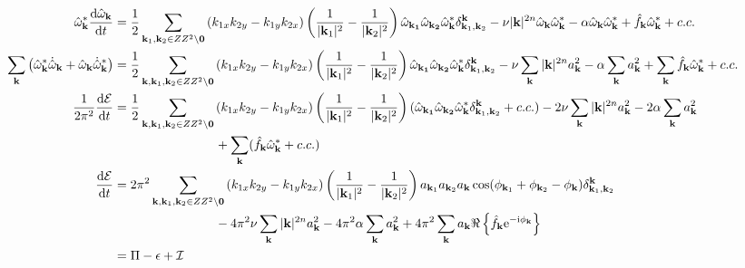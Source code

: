 \documentclass[9pt]{article}
\newcommand{\der}[2]{\frac{\mathrm{d}#1}{\mathrm{d}#2}}          	 %
\newcommand{\ii}{\mathrm{i}}      								  %
\newcommand{\e}{\mathrm{e}}      								  %
\newcommand{\omegahat}[1]{\hat{\omega}_{ \mathbf{#1} } }								%
\newcommand{\bfk}{\mathbf{k}}								%
\newcommand{\bfkn}[1]{\mathbf{k}_{#1}}								%
\begin{document}
\begin{align}
	\omegahat{k}^*\der{\omegahat{k}}{t} &= \frac{1}{2}	\sum_{\mathbf{k}_1, \mathbf{k}_2\in \mathbb{Z}^2\setminus \mathbf{0}}\left(k_{1x}k_{2y} - k_{1y}k_{2x}\right) \left(\frac{1}{|\bfkn{1}|^2} - \frac{1}{|\bfkn{2}|^2}\right) \omegahat{\bfkn{1}}\omegahat{\bfkn{2}}\omegahat{k}^* \delta_{\bfkn{1}, \bfkn{2}}^{\bfk} - \nu |\bfk|^{2n}\omegahat{k}\omegahat{k}^* - \alpha\omegahat{k}\omegahat{k}^* + \hat{f}_{\bfk} \omegahat{k}^* + c. c. \notag \\
	\sum_{\bfk}\left(\omegahat{k}^*\dot{\hat{\omega}}_\bfk + \omegahat{k}\dot{\hat{\omega}}^*_\bfk\right)&= \frac{1}{2}	\sum_{\bfk, \mathbf{k}_1, \mathbf{k}_2\in \mathbb{Z}^2\setminus \mathbf{0}}\left(k_{1x}k_{2y} - k_{1y}k_{2x}\right) \left(\frac{1}{|\bfkn{1}|^2} - \frac{1}{|\bfkn{2}|^2}\right) \omegahat{\bfkn{1}}\omegahat{\bfkn{2}}\omegahat{k}^* \delta_{\bfkn{1}, \bfkn{2}}^{\bfk} - \nu \sum_{\bfk}|\bfk|^{2n} a_{\bfk}^2 - \alpha\sum_{\bfk} a_{\bfk}^2 + \sum_{\bfk}\hat{f}_{\bfk} \omegahat{k}^* + c. c. \notag \\
	\frac{1}{2\pi^2}\der{\mathcal{E}}{t} &= \frac{1}{2}	\sum_{\bfk, \mathbf{k}_1, \mathbf{k}_2\in \mathbb{Z}^2\setminus \mathbf{0}}\left(k_{1x}k_{2y} - k_{1y}k_{2x}\right) \left(\frac{1}{|\bfkn{1}|^2} - \frac{1}{|\bfkn{2}|^2}\right) (\omegahat{\bfkn{1}}\omegahat{\bfkn{2}}\omegahat{k}^* \delta_{\bfkn{1}, \bfkn{2}}^{\bfk} + c.c.) - 2\nu \sum_{\bfk}|\bfk|^{2n} a_{\bfk}^2 - 2\alpha\sum_{\bfk} a_{\bfk}^2 \notag \\
	&\qquad \qquad \qquad \qquad+ \sum_{\bfk}(\hat{f}_{\bfk} \omegahat{k}^* + c. c.)\notag \\
	\der{\mathcal{E}}{t} &= 2\pi^2	\sum_{\bfk, \mathbf{k}_1, \mathbf{k}_2\in \mathbb{Z}^2\setminus \mathbf{0}}\left(k_{1x}k_{2y} - k_{1y}k_{2x}\right) \left(\frac{1}{|\bfkn{1}|^2} - \frac{1}{|\bfkn{2}|^2}\right) a_{\bfkn{1}} a_{\bfkn{2}} a_{\bfk} \cos(\phi_{\bfkn{1}} + \phi_{\bfkn{2}} - \phi_{\bfk}) \delta_{\bfkn{1}, \bfkn{2}}^{\bfk} \notag \\ & \qquad \qquad \qquad \qquad- 4\pi^2\nu \sum_{\bfk}|\bfk|^{2n} a_{\bfk}^2 - 4\pi^2\alpha\sum_{\bfk} a_{\bfk}^2 + 4\pi^2\sum_{\bfk}a_\bfk\Re\left\{\hat{f}_{\bfk} \e^{-\ii\phi_\bfk}\right\} \notag \\
	&= \Pi - \epsilon + \mathcal{I}
 \end{align}
\end{document}
